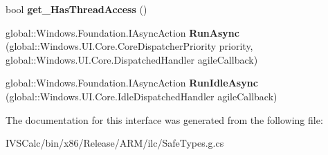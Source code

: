\begin{DoxyCompactItemize}
bool {\bfseries get\+\_\+\+Has\+Thread\+Access} ()
\item 
\mbox{\label{interface_windows_1_1_u_i_1_1_core_1_1_i_core_dispatcher_a466ce1d7a05e82289c0c50e1e6738da8}} 
global\+::\+Windows.\+Foundation.\+I\+Async\+Action {\bfseries Run\+Async} (global\+::\+Windows.\+U\+I.\+Core.\+Core\+Dispatcher\+Priority priority, global\+::\+Windows.\+U\+I.\+Core.\+Dispatched\+Handler agile\+Callback)
\item 
\mbox{\label{interface_windows_1_1_u_i_1_1_core_1_1_i_core_dispatcher_a58bf641f5f0e68594918acca63694bb4}} 
global\+::\+Windows.\+Foundation.\+I\+Async\+Action {\bfseries Run\+Idle\+Async} (global\+::\+Windows.\+U\+I.\+Core.\+Idle\+Dispatched\+Handler agile\+Callback)
\end{DoxyCompactItemize}


The documentation for this interface was generated from the following file\+:\begin{DoxyCompactItemize}
\item 
I\+V\+S\+Calc/bin/x86/\+Release/\+A\+R\+M/ilc/Safe\+Types.\+g.\+cs\end{DoxyCompactItemize}
